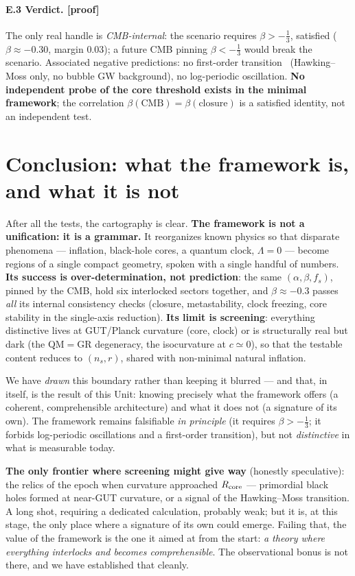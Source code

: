 \documentclass[11pt]{article}
\newcommand{\preuve}{{\small\textbf{[proof]}}}
\theoremstyle{definition}
\begin{document}
\paragraph{E.3 Verdict. \preuve}
The only real handle is \emph{CMB-internal}: the scenario requires $\beta>-\tfrac13$, satisfied
($\beta\approx-0.30$, margin $0.03$); a future CMB pinning $\beta<-\tfrac13$ would break the scenario.
Associated negative predictions: no first-order transition~\cite{ColemanDeLuccia1980,HawkingMoss1982} (Hawking--Moss only, no bubble GW
background), no log-periodic oscillation. \textbf{No independent probe of the core threshold exists in the
minimal framework}; the correlation $\beta(\text{CMB})=\beta(\text{closure})$ is a satisfied identity, not
an independent test.

\section*{Conclusion: what the framework is, and what it is not}
After all the tests, the cartography is clear. \textbf{The framework is not a unification: it is a
grammar.} It reorganizes known physics so that disparate phenomena --- inflation, black-hole cores, a
quantum clock, $\Lambda=0$ --- become regions of a single compact geometry, spoken with a single handful
of numbers. \textbf{Its success is over-determination, not prediction}: the same $(\alpha,\beta,f_s)$,
pinned by the CMB, hold six interlocked sectors together, and $\beta\approx-0.3$ passes \emph{all} its
internal consistency checks (closure, metastability, clock freezing, core stability in the single-axis
reduction). \textbf{Its limit is screening}: everything distinctive lives at GUT/Planck curvature (core,
clock) or is structurally real but dark (the QM$=$GR degeneracy, the isocurvature at $c\simeq0$), so that
the testable content reduces to $(n_s,r)$, shared with non-minimal natural inflation.

We have \emph{drawn} this boundary rather than keeping it blurred --- and that, in itself, is the result
of this Unit: knowing precisely what the framework offers (a coherent, comprehensible architecture) and
what it does not (a signature of its own). The framework remains falsifiable \emph{in principle} (it
requires $\beta>-\tfrac13$; it forbids log-periodic oscillations and a first-order transition), but not
\emph{distinctive} in what is measurable today.

\textbf{The only frontier where screening might give way} (honestly speculative): the relics of the epoch
when curvature approached $R_{\rm core}$ --- primordial black holes formed at near-GUT curvature, or a
signal of the Hawking--Moss transition. A long shot, requiring a dedicated calculation, probably weak; but
it is, at this stage, the only place where a signature of its own could emerge. Failing that, the value of
the framework is the one it aimed at from the start: \emph{a theory where everything interlocks and becomes
comprehensible}. The observational bonus is not there, and we have established that cleanly.
\end{document}
